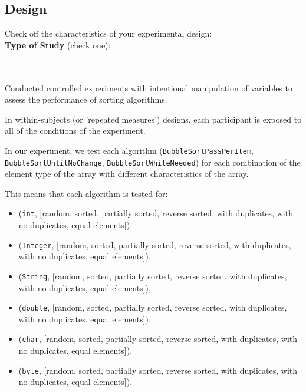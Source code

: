 \documentclass{article}
\begin{document}
\subsection{Design}
Check off the characteristics of your experimental design:\\

\textbf{Type of Study} (check one):\\
\noindent
\begin{minipage}{0.4\textwidth}
\end{minipage}%
\begin{minipage}{0.4\textwidth}
\end{minipage}%
\begin{minipage}{0.2\textwidth}
\end{minipage}\\\\
Conducted controlled experiments with intentional manipulation of variables to assess the performance of sorting algorithms.

In within-subjects (or 'repeated measures') designs, each participant is exposed to all of the conditions of the experiment.

In our experiment, we test each algorithm (\texttt{BubbleSortPassPerItem}, \texttt{BubbleSortUntilNoChange}, \texttt{BubbleSortWhileNeeded}) for each combination of the element type of the array with different characteristics of the array.

This means that each algorithm is tested for:

\begin{itemize}
    \item (\texttt{int}, [random, sorted, partially sorted, reverse sorted, with duplicates, with no duplicates, equal elements]),
    \item (\texttt{Integer}, [random, sorted, partially sorted, reverse sorted, with duplicates, with no duplicates, equal elements]),
    \item (\texttt{String}, [random, sorted, partially sorted, reverse sorted, with duplicates, with no duplicates, equal elements]),
    \item (\texttt{double}, [random, sorted, partially sorted, reverse sorted, with duplicates, with no duplicates, equal elements]),
    \item (\texttt{char}, [random, sorted, partially sorted, reverse sorted, with duplicates, with no duplicates, equal elements]),
    \item (\texttt{byte}, [random, sorted, partially sorted, reverse sorted, with duplicates, with no duplicates, equal elements]).
\end{itemize}
\end{document}
